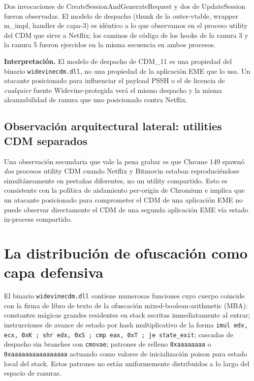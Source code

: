 \documentclass[11pt,letterpaper]{article}
\let\oldsection\section
\renewcommand{\section}{\clearpage\oldsection}
\begin{document}
\noindent Dos invocaciones de CreateSessionAndGenerateRequest y
dos de UpdateSession fueron observadas. El modelo de despacho
(thunk de la outer-vtable, wrapper m\_impl, handler de capa-3) es
idéntico a lo que observamos en el proceso utility del CDM que
sirve a Netflix; los caminos de código de los hooks de la ranura
3 y la ranura 5 fueron ejercidos en la misma secuencia en ambos
procesos.

\textbf{Interpretación.} El modelo de despacho de CDM\_11 es una
propiedad del binario \texttt{widevinecdm.dll}, no una propiedad
de la aplicación EME que lo usa. Un atacante posicionado para
influenciar el payload PSSH o el de licencia de \emph{cualquier}
fuente Widevine-protegida verá el mismo despacho y la misma
alcanzabilidad de ranura que uno posicionado contra Netflix.

\subsection{Observación arquitectural lateral: utilities CDM separados}

Una observación secundaria que vale la pena grabar es que Chrome
149 spawnó \emph{dos} procesos utility CDM cuando Netflix y
Bitmovin estaban reproduciéndose simultáneamente en pestañas
diferentes, no un utility compartido. Esto es consistente con la
política de aislamiento per-origin de Chromium e implica que un
atacante posicionado para comprometer el CDM de una aplicación
EME no puede observar directamente el CDM de una segunda
aplicación EME vía estado in-process compartido.

\section{La distribución de ofuscación como capa defensiva}
\label{sec:obfuscation}

El binario \texttt{widevinecdm.dll} contiene numerosas funciones
cuyo cuerpo coincide con la firma de libro de texto de la
ofuscación mixed-boolean-arithmetic (MBA): constantes mágicas
grandes residentes en stack escritas inmediatamente al entrar;
instrucciones de avance de estado por hash multiplicativo de la
forma \texttt{imul edx, ecx, 0xK ; shr edx, 0xS ; cmp eax, 0xT
; je state\_exit}; cascadas de despacho sin branches con
\texttt{cmovae};
patrones de relleno \texttt{0xaaaaaaaa} o
\texttt{0xaaaaaaaaaaaaaaaa} actuando como valores de
inicialización poison para estado local del stack. Estos
patrones no están uniformemente distribuidos a lo largo del
espacio de ranuras.
\end{document}
